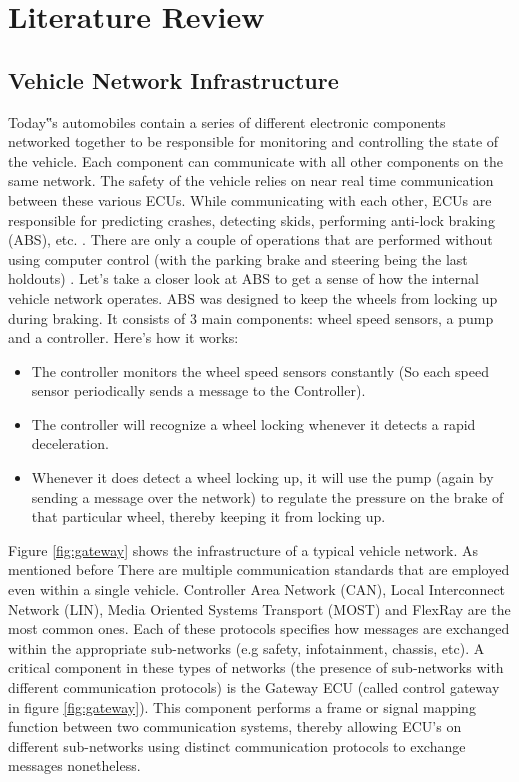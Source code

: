 \documentclass[11pt]{article}
\begin{document}
\section{Literature Review}

\subsection{Vehicle Network Infrastructure}
\label{sec:vni}
Today‟s automobiles contain a series of different electronic components networked together to be responsible for monitoring and controlling the state of the vehicle. Each component can communicate with all other components on the same network. The safety of the vehicle relies on near real time communication between these various ECUs. While communicating with each other, ECUs are responsible for predicting crashes, detecting skids, performing anti-lock braking (ABS), etc. \cite{Yadav16}. There are only a couple of operations that are performed without using computer control (with the parking brake and steering being the last holdouts) \cite{Kosher}. Let's take a closer look at ABS to get a sense of how the internal vehicle network operates. ABS was designed to keep the wheels from locking up during braking. It consists of 3 main components: wheel speed sensors, a pump and a controller. Here's how it works:

\begin{itemize}
	\item The controller monitors the wheel speed sensors constantly (So each speed sensor periodically sends a message to the Controller).
	
	\item The controller will recognize a wheel locking whenever it detects a rapid deceleration.
	
	\item Whenever it does detect a wheel locking up, it will use the pump (again by sending a message over the network) to regulate the pressure on the brake of that particular wheel, thereby keeping it from locking up.
\end{itemize}

Figure \ref{fig:gateway} shows the infrastructure of a typical vehicle network. As mentioned before There are multiple communication standards that are employed even within a single vehicle. Controller Area Network (CAN), Local Interconnect Network (LIN), Media Oriented Systems Transport (MOST) and FlexRay are the most common ones. Each of these protocols specifies how messages are exchanged within the appropriate sub-networks (e.g safety, infotainment, chassis, etc). A critical component in these types of networks (the presence of sub-networks with different communication protocols) is the Gateway ECU (called control gateway in figure \ref{fig:gateway}). This component performs a frame or signal mapping function between two communication systems, thereby allowing ECU's on different sub-networks using distinct communication protocols to exchange messages nonetheless. 
\end{document}
